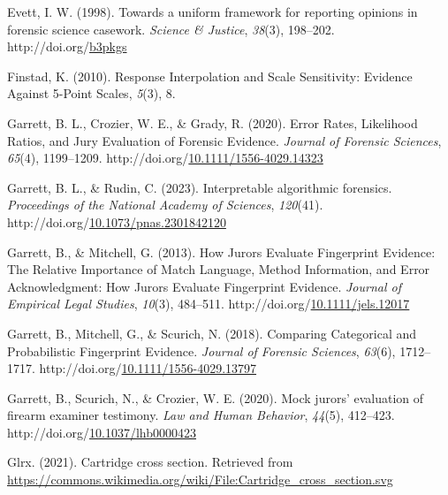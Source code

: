 \documentclass[print]{nuthesis}
\newlength{\cslhangindent}
\newenvironment{CSLReferences}[2]%
{\setlength{\parindent}{0pt}%
\everypar{\setlength{\hangindent}{\cslhangindent}}\ignorespaces}%
{\par}
\begin{document}
\begin{CSLReferences}{1}{0}
\leavevmode{}%
Evett, I. W. (1998). Towards a uniform framework for reporting opinions in forensic science casework. \emph{Science \& Justice}, \emph{38}(3), 198--202. http://doi.org/\href{https://doi.org/b3pkgs}{b3pkgs}

\leavevmode{}%
Finstad, K. (2010). Response {Interpolation} and {Scale} {Sensitivity}: {Evidence} {Against} 5-{Point} {Scales}, \emph{5}(3), 8.

\leavevmode{}%
Garrett, B. L., Crozier, W. E., \& Grady, R. (2020). Error {Rates}, {Likelihood} {Ratios}, and {Jury} {Evaluation} of {Forensic} {Evidence}. \emph{Journal of Forensic Sciences}, \emph{65}(4), 1199--1209. http://doi.org/\href{https://doi.org/10.1111/1556-4029.14323}{10.1111/1556-4029.14323}

\leavevmode{}%
Garrett, B. L., \& Rudin, C. (2023). Interpretable algorithmic forensics. \emph{Proceedings of the National Academy of Sciences}, \emph{120}(41). http://doi.org/\href{https://doi.org/10.1073/pnas.2301842120}{10.1073/pnas.2301842120}

\leavevmode{}%
Garrett, B., \& Mitchell, G. (2013). How {Jurors} {Evaluate} {Fingerprint} {Evidence}: {The} {Relative} {Importance} of {Match} {Language}, {Method} {Information}, and {Error} {Acknowledgment}: {How} {Jurors} {Evaluate} {Fingerprint} {Evidence}. \emph{Journal of Empirical Legal Studies}, \emph{10}(3), 484--511. http://doi.org/\href{https://doi.org/10.1111/jels.12017}{10.1111/jels.12017}

\leavevmode{}%
Garrett, B., Mitchell, G., \& Scurich, N. (2018). Comparing {Categorical} and {Probabilistic} {Fingerprint} {Evidence}. \emph{Journal of Forensic Sciences}, \emph{63}(6), 1712--1717. http://doi.org/\href{https://doi.org/10.1111/1556-4029.13797}{10.1111/1556-4029.13797}

\leavevmode{}%
Garrett, B., Scurich, N., \& Crozier, W. E. (2020). Mock jurors' evaluation of firearm examiner testimony. \emph{Law and Human Behavior}, \emph{44}(5), 412--423. http://doi.org/\href{https://doi.org/10.1037/lhb0000423}{10.1037/lhb0000423}

\leavevmode{}%
Glrx. (2021). Cartridge cross section. Retrieved from \url{https://commons.wikimedia.org/wiki/File:Cartridge_cross_section.svg}


\end{CSLReferences}
\end{document}
